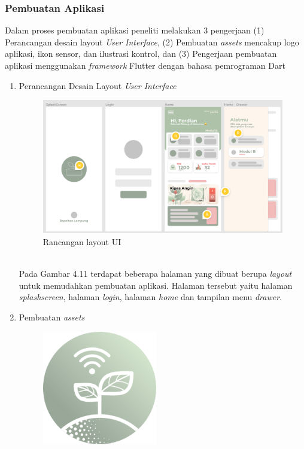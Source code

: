 \begin{flushleft}
\begin{justify}
        \subsubsection{Pembuatan Aplikasi}
        Dalam proses pembuatan aplikasi peneliti melakukan 3 pengerjaan (1) Perancangan desain layout \textit{User Interface}, (2) Pembuatan \textit{assets} mencakup logo aplikasi, ikon sensor, dan ilustrasi kontrol, dan (3) Pengerjaan pembuatan aplikasi menggunakan \textit{framework} Flutter dengan bahasa pemrograman Dart
        \begin{enumerate}
            \item Perancangan Desain Layout \textit{User Interface}
            \begin{figure}[ht]
                \centering
                \includegraphics[width=13cm]{images/UI/summary.png}
                \caption{Rancangan layout UI}
            \end{figure}
            \\Pada Gambar 4.11 terdapat beberapa halaman yang dibuat berupa \emph{layout} untuk memudahkan pembuatan aplikasi. Halaman
            tersebut yaitu halaman \emph{splashscreen}, halaman \emph{login}, halaman \emph{home} dan tampilan menu \emph{drawer}.\\
            \item Pembuatan \textit{assets}\\
            \begin{figure}[ht]
                \centering
                \includegraphics[width=5cm]{images/logo.png}

\end{figure}
\end{enumerate}
\end{justify}
\end{flushleft}
